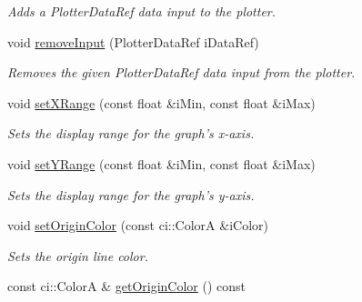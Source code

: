 \begin{DoxyCompactItemize}
\begin{DoxyCompactList}\small\item\em Adds a Plotter\-Data\-Ref data input to the plotter. \end{DoxyCompactList}\item 
\hypertarget{class_gui_plot_a8394bf0d66cf21991d1e1aab7bb02ecc}{void \hyperlink{class_gui_plot_a8394bf0d66cf21991d1e1aab7bb02ecc}{remove\-Input} (Plotter\-Data\-Ref i\-Data\-Ref)}\label{class_gui_plot_a8394bf0d66cf21991d1e1aab7bb02ecc}

\begin{DoxyCompactList}\small\item\em Removes the given Plotter\-Data\-Ref data input from the plotter. \end{DoxyCompactList}\item 
\hypertarget{class_gui_plot_ae9cdb3ce87cd2e2a6fdf3de900ff0c7f}{void \hyperlink{class_gui_plot_ae9cdb3ce87cd2e2a6fdf3de900ff0c7f}{set\-X\-Range} (const float \&i\-Min, const float \&i\-Max)}\label{class_gui_plot_ae9cdb3ce87cd2e2a6fdf3de900ff0c7f}

\begin{DoxyCompactList}\small\item\em Sets the display range for the graph's x-\/axis. \end{DoxyCompactList}\item 
\hypertarget{class_gui_plot_a9242906c392d26d67b3c196a3b2321ea}{void \hyperlink{class_gui_plot_a9242906c392d26d67b3c196a3b2321ea}{set\-Y\-Range} (const float \&i\-Min, const float \&i\-Max)}\label{class_gui_plot_a9242906c392d26d67b3c196a3b2321ea}

\begin{DoxyCompactList}\small\item\em Sets the display range for the graph's y-\/axis. \end{DoxyCompactList}\item 
\hypertarget{class_gui_plot_a911632acbcb10fbbab823503a84898e9}{void \hyperlink{class_gui_plot_a911632acbcb10fbbab823503a84898e9}{set\-Origin\-Color} (const ci\-::\-Color\-A \&i\-Color)}\label{class_gui_plot_a911632acbcb10fbbab823503a84898e9}

\begin{DoxyCompactList}\small\item\em Sets the origin line color. \end{DoxyCompactList}\item 
\hypertarget{class_gui_plot_abaec0cb9deef925de4ea44f68a8cd5de}{const ci\-::\-Color\-A \& \hyperlink{class_gui_plot_abaec0cb9deef925de4ea44f68a8cd5de}{get\-Origin\-Color} () const }\label{class_gui_plot_abaec0cb9deef925de4ea44f68a8cd5de}


\end{DoxyCompactItemize}
